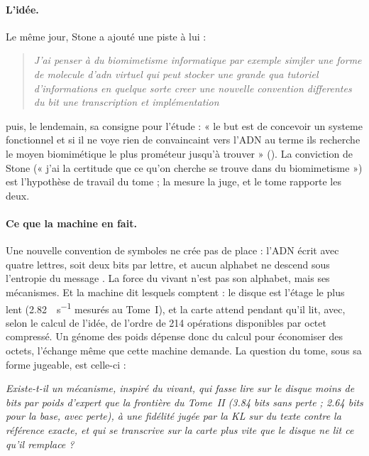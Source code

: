 \paragraph{L'idée.} Le même jour, Stone a ajouté une piste à lui :
\begin{quote}\itshape
J'ai penser à du biomimetisme informatique par exemple simjler une forme de molecule d'adn virtuel qui peut stocker une grande qua tutoriel d'informations en quelque sorte creer une nouvelle convention differentes du bit une transcription et implémentation
\end{quote}
puis, le lendemain, sa consigne pour l'étude : « le but est de concevoir un systeme fonctionnel et si il ne voye rien de convaincaint vers l'ADN au terme ils recherche le moyen biomimétique le plus prométeur jusqu'à trouver » (). La conviction de Stone (« j'ai la certitude que ce qu'on cherche se trouve dans du biomimetisme ») est l'hypothèse de travail du tome ; la mesure la juge, et le tome rapporte les deux.

\paragraph{Ce que la machine en fait.} Une nouvelle convention de symboles ne crée pas de place : l'ADN écrit avec quatre lettres, soit deux bits par lettre, et aucun alphabet ne descend sous l'entropie du message \parencite{shannon1948,cover2006}. La force du vivant n'est pas son alphabet, mais ses mécanismes. Et la machine dit lesquels comptent : le disque est l'étage le plus lent (\SI{2.82}{\Go\per\second} mesurés au Tome~I), et la carte attend pendant qu'il lit, avec, selon le calcul de l'idée, de l'ordre de 214 opérations disponibles par octet compressé. Un génome des poids dépense donc du calcul pour économiser des octets, l'échange même que cette machine demande. La question du tome, sous sa forme jugeable, est celle-ci :

\begin{center}
\begin{tcolorbox}[enhanced, width=0.92\linewidth, colback=Fond, colframe=Accent, boxrule=0.6pt, arc=1pt]
\emph{Existe-t-il un mécanisme, inspiré du vivant, qui fasse lire sur le disque moins de bits par poids d'expert que la frontière du Tome~II (\num{3.84} bits sans perte ; \num{2.64} bits pour la base, avec perte), à une fidélité jugée par la KL sur du texte contre la référence exacte, et qui se transcrive sur la carte plus vite que le disque ne lit ce qu'il remplace ?}
\end{tcolorbox}
\end{center}

